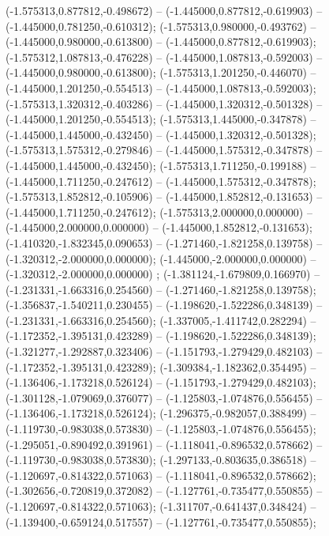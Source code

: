  (-1.575313,0.877812,-0.498672) -- (-1.445000,0.877812,-0.619903) -- (-1.445000,0.781250,-0.610312);
 (-1.575313,0.980000,-0.493762) -- (-1.445000,0.980000,-0.613800) -- (-1.445000,0.877812,-0.619903);
 (-1.575312,1.087813,-0.476228) -- (-1.445000,1.087813,-0.592003) -- (-1.445000,0.980000,-0.613800);
 (-1.575313,1.201250,-0.446070) -- (-1.445000,1.201250,-0.554513) -- (-1.445000,1.087813,-0.592003);
 (-1.575313,1.320312,-0.403286) -- (-1.445000,1.320312,-0.501328) -- (-1.445000,1.201250,-0.554513);
 (-1.575313,1.445000,-0.347878) -- (-1.445000,1.445000,-0.432450) -- (-1.445000,1.320312,-0.501328);
 (-1.575313,1.575312,-0.279846) -- (-1.445000,1.575312,-0.347878) -- (-1.445000,1.445000,-0.432450);
 (-1.575313,1.711250,-0.199188) -- (-1.445000,1.711250,-0.247612) -- (-1.445000,1.575312,-0.347878);
 (-1.575313,1.852812,-0.105906) -- (-1.445000,1.852812,-0.131653) -- (-1.445000,1.711250,-0.247612);
 (-1.575313,2.000000,0.000000) -- (-1.445000,2.000000,0.000000) -- (-1.445000,1.852812,-0.131653);
 (-1.410320,-1.832345,0.090653) -- (-1.271460,-1.821258,0.139758) -- (-1.320312,-2.000000,0.000000);
 (-1.445000,-2.000000,0.000000) -- (-1.320312,-2.000000,0.000000) ;
 (-1.381124,-1.679809,0.166970) -- (-1.231331,-1.663316,0.254560) -- (-1.271460,-1.821258,0.139758);
 (-1.356837,-1.540211,0.230455) -- (-1.198620,-1.522286,0.348139) -- (-1.231331,-1.663316,0.254560);
 (-1.337005,-1.411742,0.282294) -- (-1.172352,-1.395131,0.423289) -- (-1.198620,-1.522286,0.348139);
 (-1.321277,-1.292887,0.323406) -- (-1.151793,-1.279429,0.482103) -- (-1.172352,-1.395131,0.423289);
 (-1.309384,-1.182362,0.354495) -- (-1.136406,-1.173218,0.526124) -- (-1.151793,-1.279429,0.482103);
 (-1.301128,-1.079069,0.376077) -- (-1.125803,-1.074876,0.556455) -- (-1.136406,-1.173218,0.526124);
 (-1.296375,-0.982057,0.388499) -- (-1.119730,-0.983038,0.573830) -- (-1.125803,-1.074876,0.556455);
 (-1.295051,-0.890492,0.391961) -- (-1.118041,-0.896532,0.578662) -- (-1.119730,-0.983038,0.573830);
 (-1.297133,-0.803635,0.386518) -- (-1.120697,-0.814322,0.571063) -- (-1.118041,-0.896532,0.578662);
 (-1.302656,-0.720819,0.372082) -- (-1.127761,-0.735477,0.550855) -- (-1.120697,-0.814322,0.571063);
 (-1.311707,-0.641437,0.348424) -- (-1.139400,-0.659124,0.517557) -- (-1.127761,-0.735477,0.550855);
